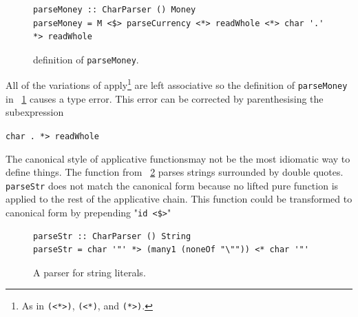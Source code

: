  
 \begin{figure}[t] 
  \begin{lstlisting}
parseMoney :: CharParser () Money
parseMoney = M <$> parseCurrency <*> readWhole <*> char '.' *> readWhole
 \end{lstlisting}
 \caption{\DIFdelbeginFL {}\DIFdelendFL \DIFaddbeginFL {}\DIFaddendFL definition of \texttt{parseMoney}\DIFdelbeginFL {}\DIFdelendFL .}
 \label{typeParseErr}
 \end{figure}

All of the variations of apply\footnote{As in \texttt{(<*>)}, \texttt{(<*)}, and \texttt{(*>)}.} are left associative so \DIFaddbegin {}\DIFaddend the definition of \texttt{parseMoney} in \DIFdelbegin {}\DIFdelend \DIFaddbegin {}\DIFaddend ~\ref{typeParseErr} causes a type error. This error can be corrected by parenthesising the subexpression\DIFdelbegin %
\DIFdelend \DIFaddbegin \DIFadd{:
}

\begin{center}
	 \DIFaddend \texttt{char \textquotesingle.\textquotesingle~*> readWhole}
\DIFdelbegin {}\DIFdelend \DIFaddbegin \end{center}
 \DIFaddend 

The canonical style of applicative functions\DIFaddbegin {}\DIFaddend may not be the most idiomatic way to define things. The function from \DIFdelbegin {}\DIFdelend \DIFaddbegin {}\DIFaddend ~\ref{strParse} parses strings surrounded by double quotes. \texttt{parseStr} does not match the canonical form because no lifted pure function is applied to the rest of the applicative chain. This function could be transformed to canonical form by prepending "\texttt{id <\$>}\DIFdelbegin {}\DIFdelend "\DIFaddbegin {}\DIFaddend 


\begin{figure}[t]
\begin{lstlisting}
parseStr :: CharParser () String 
parseStr = char '"' *> (many1 (noneOf "\"")) <* char '"'
\end{lstlisting}
\caption{A parser for string literals.}
\label{strParse}
\end{figure}


